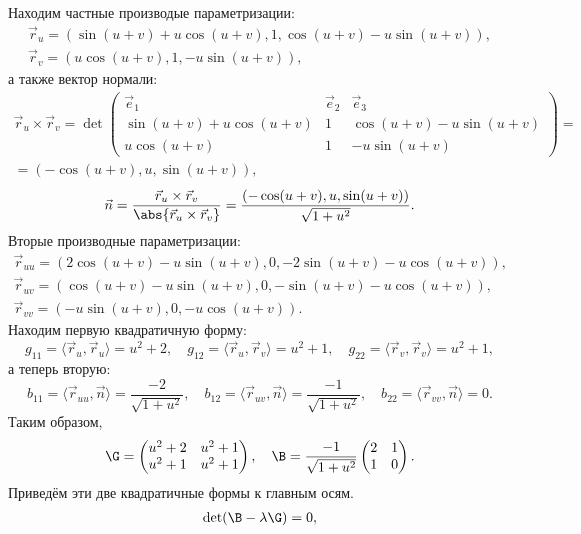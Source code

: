 \begin{solution}
	Находим частные производые параметризации:
	\begin{gather*}
		\vec{r}_u = (\sin(u + v) + u\cos(u + v), 1, \cos(u + v) - u\sin(u + v)),\\
		\vec{r}_v = (u\cos(u + v), 1, -u\sin(u + v)),
	\end{gather*}
	а также вектор нормали:
	\begin{multline*}
		\vec{r}_u \times \vec{r}_v = \det
		\begin{pmatrix}
			\vec{e}_1 & \vec{e}_2 & \vec{e}_3\\
			\sin(u + v) + u\cos(u + v) & 1 & \cos(u + v) - u\sin(u + v)\\
			u\cos(u + v) & 1 & -u\sin(u + v)
		\end{pmatrix} =\\
		= (-\cos(u + v), u, \sin(u + v)),
	\end{multline*}
	\[
		\vec{n} = \frac{\vec{r}_u \times \vec{r}_v}{\abs{\vec{r}_u \times \vec{r}_v}} = \frac{(-\cos(u + v), u, \sin(u + v))}{\sqrt{1 + u^2}}.
	\]
	Вторые производные параметризации:
	\begin{gather*}
		\vec{r}_{uu} = (2\cos(u + v) - u\sin(u + v), 0, -2\sin(u + v) - u\cos(u + v)),\\
		\vec{r}_{uv} = (\cos(u + v) - u\sin(u + v), 0, -\sin(u + v) - u\cos(u + v)),\\
		\vec{r}_{vv} = (-u\sin(u + v), 0, -u\cos(u + v)).
	\end{gather*}
	Находим первую квадратичную форму:
	\[
		g_{11} = \langle\vec{r}_u, \vec{r}_u\rangle = u^2 + 2,\quad
		g_{12} = \langle\vec{r}_u, \vec{r}_v\rangle = u^2 + 1,\quad
		g_{22} = \langle\vec{r}_v, \vec{r}_v\rangle = u^2 + 1,
	\]
	а теперь вторую:
	\[
		b_{11} = \langle\vec{r}_{uu}, \vec{n}\rangle = \frac{-2}{\sqrt{1 + u^2}},\quad
		b_{12} = \langle\vec{r}_{uv}, \vec{n}\rangle = \frac{-1}{\sqrt{1 + u^2}},\quad
		b_{22} = \langle\vec{r}_{vv}, \vec{n}\rangle = 0.
	\]
	Таким образом,
	\[
		\G =
		\begin{pmatrix}
			u^2 + 2 & u^2 + 1\\
			u^2 + 1 & u^2 + 1
		\end{pmatrix},\quad\B = \frac{-1}{\sqrt{1 + u^2}}
		\begin{pmatrix}
			2 & 1\\
			1 & 0
		\end{pmatrix}.
	\]
	Приведём эти две квадратичные формы к главным осям.
	\begin{gather*}
		\det(\B - \lambda\G) = 0,\\

\end{gather*}
\end{solution}
